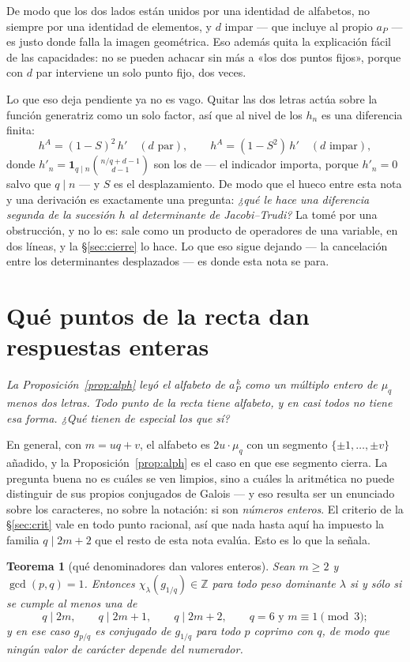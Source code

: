 \documentclass[11pt,a4paper]{article}
\newtheorem{theorem}{Teorema}[section]
\begin{document}
\noindent De modo que los dos lados están unidos por una identidad de alfabetos, no siempre por una
identidad de elementos, y $d$ impar --- que incluye al propio $a_P$ --- es justo donde falla la
imagen geométrica. Eso además quita la explicación fácil de las capacidades: no se pueden achacar sin
más a «los dos puntos fijos», porque con $d$ par interviene un solo punto fijo, dos veces.

Lo que eso deja pendiente ya no es vago. Quitar las dos letras actúa sobre la función
generatriz como un solo factor, así que al nivel de los $h_n$ es una diferencia finita:
\[
h^{A} = (1-S)^2\,h' \quad (d \text{ par}), \qquad h^{A} = (1-S^2)\,h' \quad (d \text{ impar}),
\]
donde $h'_n=\mathbf{1}_{q\mid n}\binom{n/q+d-1}{d-1}$ son los de \cite{Prasad16b} --- el indicador importa, porque $h'_n=0$ salvo que $q\mid n$ --- y $S$ es el desplazamiento. De modo que el hueco
entre esta nota y una derivación es exactamente una pregunta: \emph{¿qué le hace una diferencia
segunda de la sucesión $h$ al determinante de Jacobi--Trudi?} La tomé por una obstrucción, y no lo
es: sale como un producto de operadores de una variable, en dos líneas, y la \S\ref{sec:cierre} lo
hace. Lo que eso sigue dejando --- la cancelación entre los determinantes desplazados --- es donde
esta nota se para.


\section{Qué puntos de la recta dan respuestas enteras}\label{sec:clasif}

\noindent\emph{La Proposición~\ref{prop:alph} leyó el alfabeto de $a_P^{\,k}$ como un múltiplo entero
de $\mu_q$ menos dos letras. Todo punto de la recta tiene alfabeto, y en casi todos no tiene esa
forma. ¿Qué tienen de especial los que sí?}

\smallskip
\noindent En general, con $m=uq+v$, el alfabeto es $2u\cdot\mu_q$ con un segmento
$\{\pm1,\dots,\pm v\}$ añadido, y la Proposición~\ref{prop:alph} es el caso en que ese segmento
cierra. La pregunta buena no es cuáles se ven limpios, sino a cuáles la aritmética no puede
distinguir de sus propios conjugados de Galois --- y eso resulta ser un enunciado sobre los
caracteres, no sobre la notación: si son \emph{números enteros}. El criterio de la \S\ref{sec:crit}
vale en todo punto racional, así que nada hasta aquí ha impuesto la familia $q\mid 2m+2$ que el
resto de esta nota evalúa. Esto es lo que la señala.

\begin{theorem}[qué denominadores dan valores enteros]\label{thm:clasif}
Sean $m\ge2$ y $\gcd(p,q)=1$. Entonces $\chi_\lambda(g_{1/q})\in\mathbb{Z}$ para \emph{todo} peso
dominante $\lambda$ si y sólo si se cumple al menos una de
\[
q\mid 2m,\qquad q\mid 2m+1,\qquad q\mid 2m+2,\qquad q=6 \text{ y } m\equiv1 \!\!\pmod 3 ;
\]
y en ese caso $g_{p/q}$ es conjugado de $g_{1/q}$ para todo $p$ coprimo con $q$, de modo que ningún
valor de carácter depende del numerador.
\end{theorem}
\end{document}
